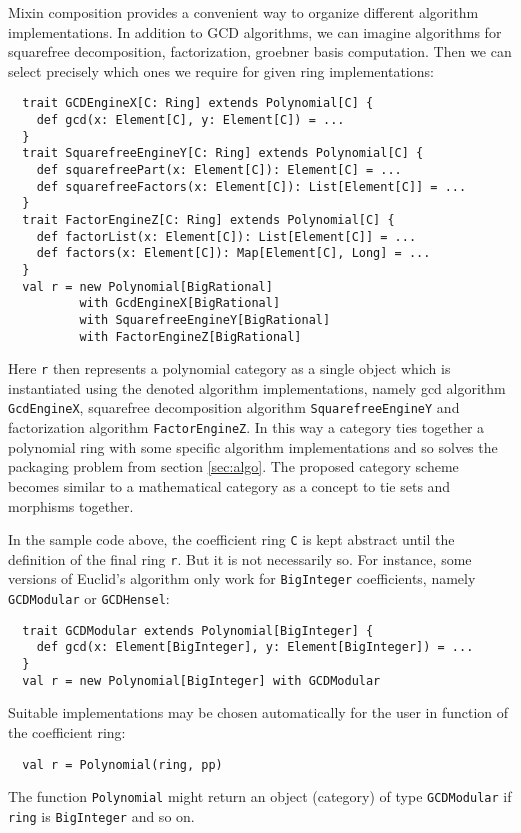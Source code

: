 \documentclass{llncs}
\newcommand{\code}[1]{\texttt{#1}}
\begin{document}
Mixin composition provides a convenient way to organize different
algorithm implementations. In addition to GCD algorithms, we can
imagine algorithms for squarefree decomposition, factorization,
groebner basis computation. Then we can select precisely which ones we
require for given ring implementations:
%
\begin{verbatim}
  trait GCDEngineX[C: Ring] extends Polynomial[C] {
    def gcd(x: Element[C], y: Element[C]) = ...
  }
  trait SquarefreeEngineY[C: Ring] extends Polynomial[C] {
    def squarefreePart(x: Element[C]): Element[C] = ...
    def squarefreeFactors(x: Element[C]): List[Element[C]] = ...
  }
  trait FactorEngineZ[C: Ring] extends Polynomial[C] {
    def factorList(x: Element[C]): List[Element[C]] = ...
    def factors(x: Element[C]): Map[Element[C], Long] = ...
  }
  val r = new Polynomial[BigRational]
          with GcdEngineX[BigRational] 
          with SquarefreeEngineY[BigRational]
          with FactorEngineZ[BigRational]
\end{verbatim}
%
Here \code{r} then represents a polynomial category as a single object
which is instantiated using the denoted algorithm implementations,
namely gcd algorithm \code{Gcd\-Engine\-X}, squarefree decomposition
algorithm \code{Square\-free\-Engine\-Y} and factorization algorithm
\code{Factor\-Engine\-Z}. In this way a category ties together a
polynomial ring with some specific algorithm implementations and so
solves the packaging problem from section \ref{sec:algo}.
The proposed category scheme becomes similar to a mathematical
category as a concept to tie sets and morphisms together.

In the sample code above, the coefficient ring \code{C} is kept abstract until
the definition of the final ring \code{r}. But it is not necessarily so. For
instance, some versions of Euclid's algorithm only work for \code{BigInteger}
coefficients, namely \code{GCDModular} or \code{GCDHensel}:
%
\begin{verbatim}
  trait GCDModular extends Polynomial[BigInteger] {
    def gcd(x: Element[BigInteger], y: Element[BigInteger]) = ...
  }
  val r = new Polynomial[BigInteger] with GCDModular
\end{verbatim}

Suitable implementations may be chosen automatically for the user in function
of the coefficient ring:
%
\begin{verbatim}
  val r = Polynomial(ring, pp)
\end{verbatim}
%
The function \code{Poly\-nomial} might return an object (category) of
type \code{GCD\-Modular} if \code{ring} is \code{Big\-Integer} and
so on.
\end{document}
